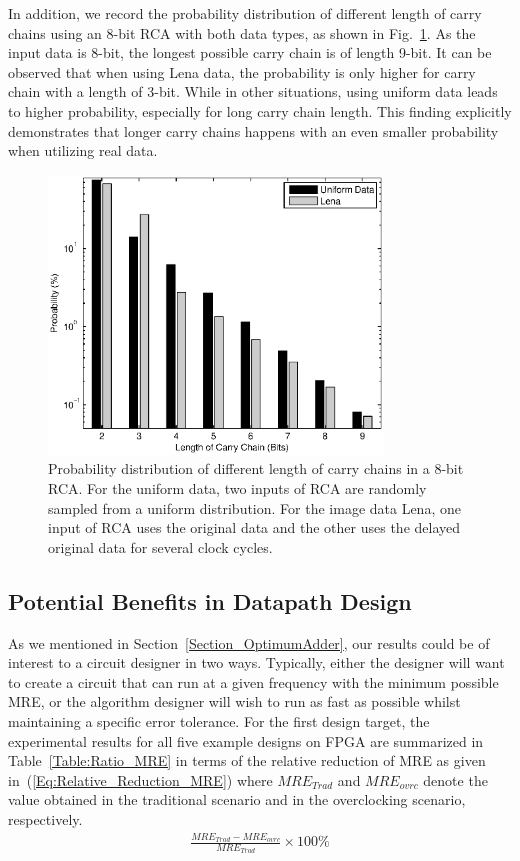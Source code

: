 \documentclass[prodmode,acmtrets]{acmsmall} %
\begin{document}

In addition, we record the probability distribution of different length of carry chains using an 8-bit RCA with both data types, as shown in Fig.~\ref{Fig:CarryDistribution}. As the input data is 8-bit, the longest possible carry chain is of length 9-bit. It can be observed that when using Lena data,  the probability is only higher for carry chain with a length of 3-bit. While in other situations, using uniform data leads to higher probability, especially for long carry chain length. This finding explicitly demonstrates that longer carry chains happens with an even smaller probability when utilizing real data.

\begin{figure}[tbp]
  \centering
  \includegraphics[width=3.5in]{./Figures/CC_length2.eps}
  \caption{Probability distribution of different length of carry chains in a 8-bit RCA. For the uniform data, two inputs of RCA are randomly sampled from a uniform distribution. For the image data Lena, one input of RCA uses the original data and the other uses the delayed original data for several clock cycles.}
  \label{Fig:CarryDistribution}
\end{figure}

\subsection{Potential Benefits in Datapath Design}
As we mentioned in Section~\ref{Section_OptimumAdder}, our results could be of interest to a circuit designer in two ways. Typically, either the designer will want to create a circuit that can run at a given frequency with the minimum possible MRE, or the algorithm designer will wish to run as fast as possible whilst maintaining a specific error tolerance. For the first design target, the experimental results for all five example designs on FPGA are summarized in Table~\ref{Table:Ratio_MRE} in terms of the relative reduction of MRE as given in~(\ref{Eq:Relative_Reduction_MRE}) where $MRE_{Trad}$ and $MRE_{ovrc}$ denote the value obtained in the traditional scenario and in the overclocking scenario, respectively.
%
\begin{eqnarray}\label{Eq:Relative_Reduction_MRE}
  \frac{MRE_{Trad}-MRE_{ovrc}}{MRE_{Trad}}\times 100\%
\end{eqnarray}
\end{document}
